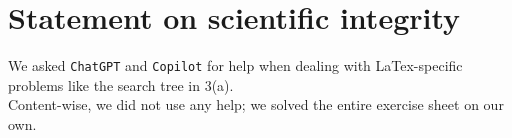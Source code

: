 \documentclass{article} %
\begin{document}
\section*{Statement on scientific integrity}
We asked \texttt{ChatGPT} and \texttt{Copilot} for help when dealing with LaTex-specific
problems like the search tree in 3(a).\\
Content-wise, we did not use any help; we solved the entire exercise sheet on our own.
\end{document}
